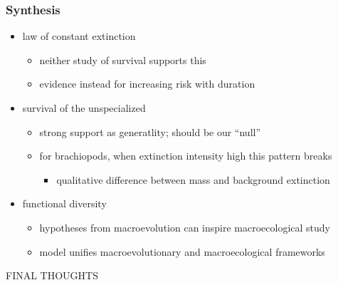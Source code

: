 \documentclass{beamer}
\begin{document}
\begin{frame}
  \frametitle{Synthesis}

  \begin{itemize}
    \item \alert{law of constant extinction}
      \begin{itemize}
        \item neither study of survival supports this
        \item evidence instead for increasing risk with duration
      \end{itemize}
    \item \alert{survival of the unspecialized}
      \begin{itemize}
        \item strong support as generatlity; should be our ``null''
        \item for brachiopods, when extinction intensity high this pattern breaks
          \begin{itemize}
            \item qualitative difference between mass and background extinction
          \end{itemize}
      \end{itemize}
    \item \alert{functional diversity}
      \begin{itemize}
        \item hypotheses from macroevolution can inspire macroecological study
        \item model unifies macroevolutionary and macroecological frameworks
      \end{itemize}
  \end{itemize}
\end{frame}


\begin{frame}
  \begin{center}
    \huge{\uppercase{final thoughts}}
  \end{center}
\end{frame}
\end{document}

